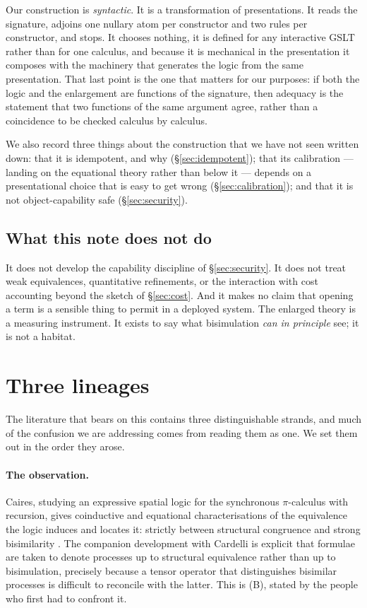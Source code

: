 \documentclass[11pt]{article}
\theoremstyle{plain}
\theoremstyle{definition}
\begin{document}
Our construction is \emph{syntactic}. It is a transformation of presentations. It reads the signature,
adjoins one nullary atom per constructor and two rules per constructor, and stops. It chooses nothing,
it is defined for any interactive GSLT rather than for one calculus, and because it is mechanical in
the presentation it composes with the machinery that generates the logic from the same presentation.
That last point is the one that matters for our purposes: if both the logic and the enlargement are
functions of the signature, then adequacy is the statement that two functions of the same argument
agree, rather than a coincidence to be checked calculus by calculus.

We also record three things about the construction that we have not seen written down: that it is
idempotent, and why (\S\ref{sec:idempotent}); that its calibration --- landing on the equational
theory rather than below it --- depends on a presentational choice that is easy to get wrong
(\S\ref{sec:calibration}); and that it is not object-capability safe (\S\ref{sec:security}).

\subsection{What this note does not do}

It does not develop the capability discipline of \S\ref{sec:security}. It does not treat weak
equivalences, quantitative refinements, or the interaction with cost accounting beyond the sketch of
\S\ref{sec:cost}. And it makes no claim that opening a term is a sensible thing to permit in a
deployed system. The enlarged theory is a measuring instrument. It exists to say what bisimulation
\emph{can in principle} see; it is not a habitat.

\section{Three lineages}
\label{sec:lineages}

The literature that bears on this contains three distinguishable strands, and much of the confusion
we are addressing comes from reading them as one. We set them out in the order they arose.

\paragraph{The observation.} Caires, studying an expressive spatial logic for the synchronous
$\pi$-calculus with recursion, gives coinductive and equational characterisations of the equivalence
the logic induces and locates it: strictly between structural congruence and strong bisimilarity
\cite{CairesObs}. The companion development with Cardelli \cite{CairesCardelliI,CairesCardelliII} is
explicit that formulae are taken to denote processes up to structural equivalence rather than up to
bisimulation, precisely because a tensor operator that distinguishes bisimilar processes is difficult
to reconcile with the latter. This is (B), stated by the people who first had to confront it.
\end{document}
